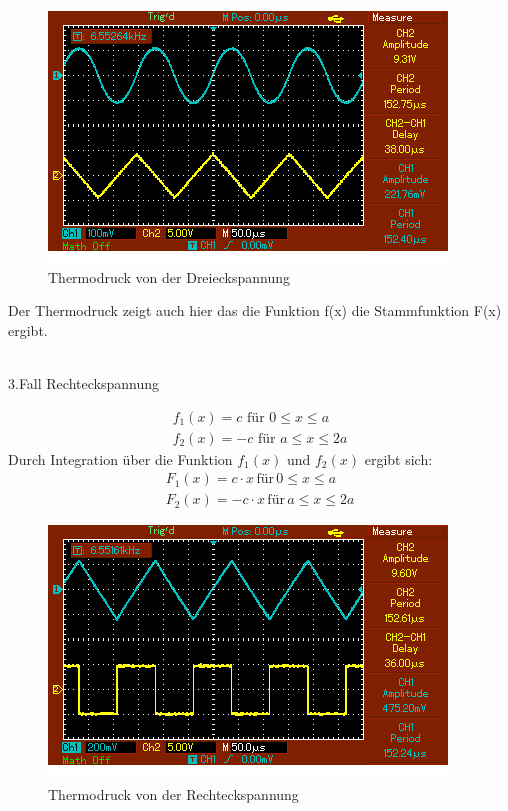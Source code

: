 \begin{figure}[H]
  \centering
  \includegraphics[width=\textwidth]{Dr1.png}
  \caption{Thermodruck von der Dreieckspannung}
  \label{fig:11}
\end{figure}
Der Thermodruck zeigt auch hier das die Funktion f(x) die Stammfunktion F(x) ergibt.\\\\
\centerline{3.Fall Rechteckspannung}
\begin{align*}
f_1 (x) =  c \,\, \text{für} \,\, 0 \leq x \leq a \\
f_2 (x) =  -c \,\, \text{für} \,\, a\leq x \leq 2a
\end{align*}
Durch Integration über die Funktion $f_1 (x)$ und $f_2 (x)$ ergibt sich:
\begin{align*}
  F_1 (x) =  c\cdot x \, \text{für} \, 0 \leq x \leq a \\
  F_2 (x) =  -c\cdot x \, \text{für} \, a\leq x \leq 2a
\end{align*}
\begin{figure}[H]
  \centering
  \includegraphics[width=\textwidth]{Re.png}
  \caption{Thermodruck von der Rechteckspannung}
  \label{fig:12}
 \end{figure}
